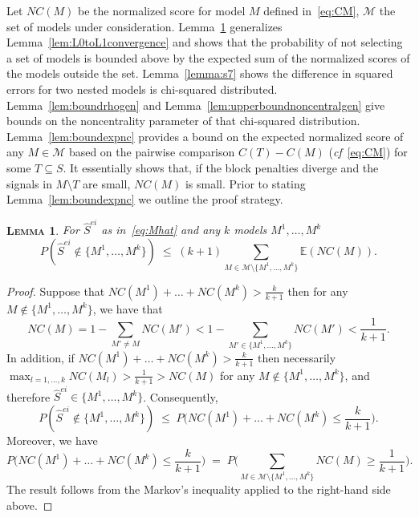 \documentclass[
  12pt]{article}
\newcommand{\E}{\mathbb{E}}
\newcommand{\M}{\mathcal{M}}
\newtheorem{lem}[thm]{\textsc{Lemma}}
\begin{document}
Let $NC(M)$ be the normalized score for model $M$ defined in~\eqref{eq:CM}, $\M$ the set of models under consideration. Lemma~\ref{lem:L0toL1convergencegen} generalizes Lemma~\ref{lem:L0toL1convergence} and shows that the probability of not selecting a set of models is bounded above by the expected sum of the normalized scores of the models outside the set.  Lemma~\ref{lemma:s7} shows the difference in squared errors for two nested models is chi-squared distributed. Lemma~\ref{lem:boundrhogen} and Lemma~\ref{lem:upperboundnoncentralgen} give bounds on the noncentrality parameter of that chi-squared distribution. Lemma~\ref{lem:boundexpnc} provides a bound on the expected normalized score of any $M \in \M$ based on the pairwise comparison $C(T)-C(M)$ (\emph{cf}~\eqref{eq:CM}) for some $T\subseteq S$. It essentially shows that, if the block penalties diverge and the signals in $M\setminus T$ are small, $NC(M)$ is small. Prior to stating Lemma~\ref{lem:boundexpnc} we outline the proof strategy.

\begin{lem}\label{lem:L0toL1convergencegen} For $\hat{S}^{ei}$ as in~\eqref{eq:Mhat} and any $k$ models $M^1,\ldots,M^k$
$$P(\hat{S}^{ei}\not\in \{M^1,\ldots,M^k\})\;\leq\; (k+1) \sum_{M \in \M\setminus \{M^1,\ldots,M^k\}}\E\left( NC(M)\right).$$
\end{lem}

\begin{proof}
Suppose that $NC(M^1)+\ldots+NC(M^k)>\frac{k}{k+1}$ then for any $M\not\in \{M^1,\ldots,M^k\}$, we have that
$$NC(M)= 1-\sum_{M' \neq M} NC(M') < 1 - \sum_{M' \in \{M^1,\ldots,M^k\}} NC(M') < \frac{1}{k+1}.$$ 
In addition, if $NC(M^1)+\ldots+NC(M^k)>\frac{k}{k+1}$ then necessarily $\max_{l=1,\ldots,k}NC(M_l)> \frac{1}{k+1} > NC(M) $ for any $M \not\in \{M^1,\ldots,M^k\}$, and therefore $\hat{S}^{ei}\in \{M^1,\ldots,M^k\}$. Consequently, 
$$
P(\hat{S}^{ei}\not\in \{M^1,\ldots,M^k\})\; \leq\; P\Big(NC(M^1)+\ldots+NC(M^k)\leq\frac{k}{k+1}\Big).$$
Moreover, we have
$$P\Big(NC(M^1)+\ldots+NC(M^k)\leq\frac{k}{k+1}\Big)\;=\;P\Big(\sum_{M \in \M\setminus \{M^1,\ldots,M^k\}} NC(M)\geq \frac{1}{k+1}\Big).$$
The result follows from the Markov's inequality applied to the right-hand side above.
\end{proof}
\end{document}
